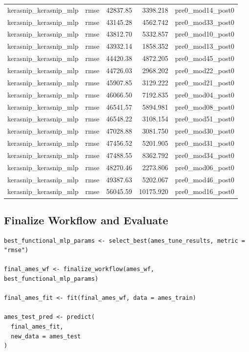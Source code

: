\begin{table}
\begin{tabular}{llrrl}
\addlinespace
kerasnip\_kerasnip\_mlp & rmse & 42837.85 & 3398.218 & pre0\_mod14\_post0\\
kerasnip\_kerasnip\_mlp & rmse & 43145.28 & 4562.742 & pre0\_mod33\_post0\\
kerasnip\_kerasnip\_mlp & rmse & 43812.70 & 5332.857 & pre0\_mod10\_post0\\
kerasnip\_kerasnip\_mlp & rmse & 43932.14 & 1858.352 & pre0\_mod13\_post0\\
kerasnip\_kerasnip\_mlp & rmse & 44420.38 & 4872.205 & pre0\_mod45\_post0\\
\addlinespace
kerasnip\_kerasnip\_mlp & rmse & 44726.03 & 2968.202 & pre0\_mod22\_post0\\
kerasnip\_kerasnip\_mlp & rmse & 45907.85 & 3129.222 & pre0\_mod21\_post0\\
kerasnip\_kerasnip\_mlp & rmse & 46066.50 & 7192.835 & pre0\_mod04\_post0\\
kerasnip\_kerasnip\_mlp & rmse & 46541.57 & 5894.981 & pre0\_mod08\_post0\\
kerasnip\_kerasnip\_mlp & rmse & 46548.22 & 3108.154 & pre0\_mod51\_post0\\
\addlinespace
kerasnip\_kerasnip\_mlp & rmse & 47028.88 & 3081.750 & pre0\_mod30\_post0\\
kerasnip\_kerasnip\_mlp & rmse & 47456.52 & 5201.905 & pre0\_mod31\_post0\\
kerasnip\_kerasnip\_mlp & rmse & 47488.55 & 8362.792 & pre0\_mod34\_post0\\
kerasnip\_kerasnip\_mlp & rmse & 48270.46 & 2273.806 & pre0\_mod06\_post0\\
kerasnip\_kerasnip\_mlp & rmse & 49387.63 & 5202.067 & pre0\_mod46\_post0\\
\addlinespace
kerasnip\_kerasnip\_mlp & rmse & 56045.59 & 10175.920 & pre0\_mod16\_post0\\
\bottomrule
\end{tabular}
\endgroup{}
\end{table}

\subsection{Finalize Workflow and Evaluate}\label{finalize-workflow-and-evaluate}

\begin{verbatim}
best_functional_mlp_params <- select_best(ames_tune_results, metric = "rmse")

final_ames_wf <- finalize_workflow(ames_wf, best_functional_mlp_params)

final_ames_fit <- fit(final_ames_wf, data = ames_train)

ames_test_pred <- predict(
  final_ames_fit,
  new_data = ames_test
)
\end{verbatim}

